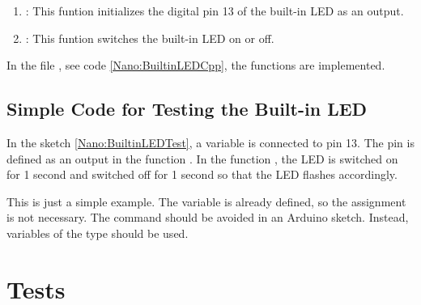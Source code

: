 \begin{enumerate}
    \item {}: This funtion initializes the digital pin 13 of the built-in LED as an output.
    \item {}: This funtion switches the built-in LED  on or off.
\end{enumerate}

{
    \label{Nano:BultinLEDHeader}
}

In the file , see code \ref{Nano:BuiltinLEDCpp}, the functions are implemented.

{
  \label{Nano:BuiltinLEDCpp}
}


\subsection{Simple Code for Testing the Built-in LED}

In the sketch \ref{Nano:BuiltinLEDTest}, a variable is connected to pin 13. The pin is defined as an output in the function . In the function , the LED is switched on for 1 second and switched off for 1 second so that the LED flashes accordingly.



{
  \label{Nano:BuiltinLEDTest}
}

\bigskip

This is just a simple example. The variable  is already defined, so the assignment is not necessary. The command  should be avoided in an Arduino sketch. Instead, variables of the type  should be used.


\section{Tests}

